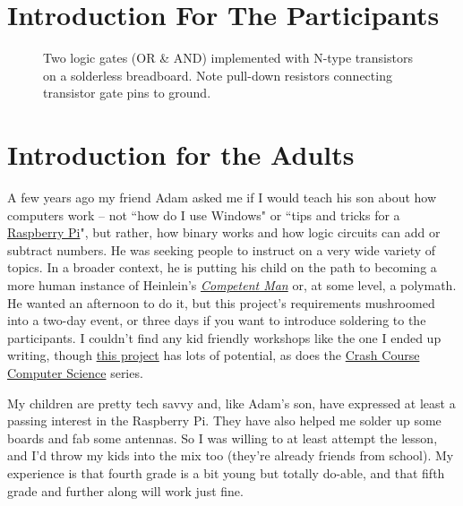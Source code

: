 \section{Introduction For The Participants}



\clearpage
\newpage

\begin{figure}[!hb]
\begin{center}
\medskip
\caption{Two logic gates (OR \& AND) implemented with N-type transistors on a solderless breadboard. Note pull-down resistors connecting transistor gate pins to ground.}
\end{center}
\end{figure}



\section{Introduction for the Adults}

A few years ago my friend Adam asked me if I would teach his son about how computers work -- not ``how do I use Windows" or ``tips and tricks for a {\color{webblue}\href{https://www.raspberrypi.org}{Raspberry Pi}}", but rather, how binary works and how logic circuits can add or subtract numbers. He was seeking people to instruct on a very wide variety of topics. In a broader context, he is putting his child on the path to becoming a more human instance of Heinlein's {\color{webblue}\href{https://en.wikipedia.org/wiki/Competent_man}{\emph{Competent Man}}} or, at some level, a polymath. He wanted an afternoon to do it, but this project's requirements mushroomed into a two-day event, or three days if you want to introduce soldering to the participants. I couldn't find any kid friendly workshops like the one I ended up writing, though {\color{webblue}\href{https://www.raspberrypi.org/blog/digital-making-curriculum/}{this project}} has lots of potential, as does the {\color{webblue}\href{https://www.youtube.com/playlist?list=PLME-KWdxI8dcaHSzzRsNuOLXtM2Ep_C7a}{Crash Course Computer Science}} series. 

My children are pretty tech savvy and, like Adam's son, have expressed at least a passing interest in the Raspberry Pi. They have also helped me solder up some boards and fab some antennas. So I was willing to at least attempt the lesson, and I'd throw my kids into the mix too (they're already friends from school). My experience is that fourth grade is a bit young but totally do-able, and that fifth grade and further along will work just fine.

